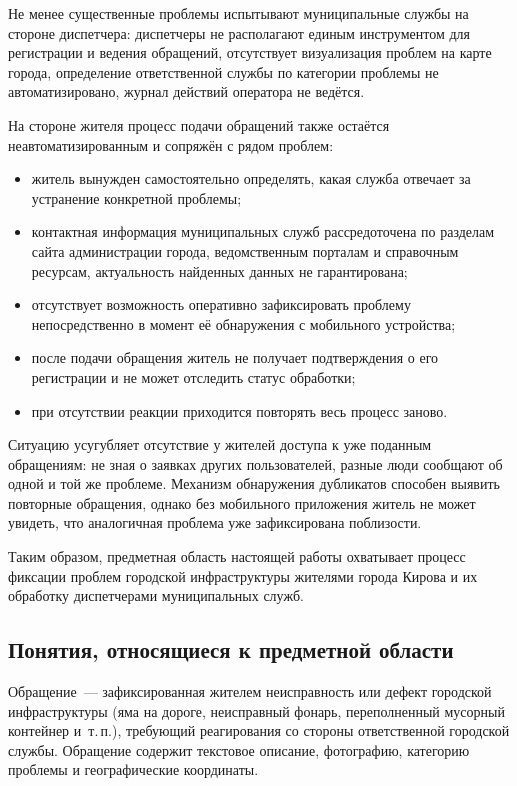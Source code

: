 Не менее существенные проблемы испытывают муниципальные службы на стороне диспетчера: диспетчеры не располагают единым инструментом для регистрации и ведения обращений, отсутствует визуализация проблем на карте города, определение ответственной службы по категории проблемы не автоматизировано, журнал действий оператора не ведётся.

На стороне жителя процесс подачи обращений также остаётся неавтоматизированным и сопряжён с рядом проблем:
\begin{itemize}
    \item житель вынужден самостоятельно определять, какая служба отвечает за устранение конкретной проблемы;
    \item контактная информация муниципальных служб рассредоточена по разделам сайта администрации города, ведомственным порталам и справочным ресурсам, актуальность найденных данных не гарантирована;
    \item отсутствует возможность оперативно зафиксировать проблему непосредственно в момент её обнаружения с мобильного устройства;
    \item после подачи обращения житель не получает подтверждения о его регистрации и не может отследить статус обработки;
    \item при отсутствии реакции приходится повторять весь процесс заново.
\end{itemize}

Ситуацию усугубляет отсутствие у жителей доступа к уже поданным обращениям: не зная о заявках других пользователей, разные люди сообщают об одной и той же проблеме. Механизм обнаружения дубликатов способен выявить повторные обращения, однако без мобильного приложения житель не может увидеть, что аналогичная проблема уже зафиксирована поблизости.

Таким образом, предметная область настоящей работы охватывает процесс фиксации проблем городской инфраструктуры жителями города Кирова и их обработку диспетчерами муниципальных служб.

\subsection{Понятия, относящиеся к предметной области}

Обращение~--- зафиксированная жителем неисправность или дефект городской инфраструктуры (яма на дороге, неисправный фонарь, переполненный мусорный контейнер и~т.\,п.), требующий реагирования со стороны ответственной городской службы. Обращение содержит текстовое описание, фотографию, категорию проблемы и географические координаты.

